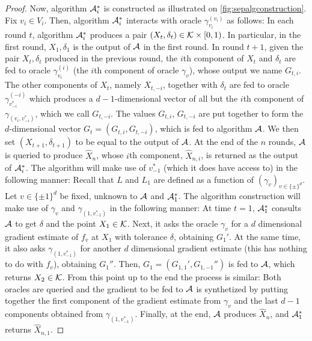 \begin{proof}
Now, algorithm $\mathcal{A}_i^*$ is constructed as illustrated on \cref{fig:sepalgconstruction}.
Fix $v_i\in V_i$. Then, algorithm $\mathcal{A}_i^*$ interacts with oracle $\gamma_{v_i}^{(v_i)}$ as follows:
In each round $t$, algorithm $\mathcal{A}_i^*$ produces a pair $(X_t,\delta_t) \in \mathcal{K} \times [0,1)$. 
In particular, in the first round, $X_1,\delta_1$ is the output of $\mathcal{A}$ in the first round.
In round $t+1$, given the pair $X_t,\delta_t$ produced in the previous round,
the $i$th component of $X_t$ and $\delta_t$ are fed to oracle $\gamma_{v_i}^{(i)}$ (the $i$th component of oracle $\gamma_v$), 
whose output we name $G_{t,i}$. 
The other components of $X_t$, namely $X_{t,-i}$, together with $\delta_t$ are fed to
oracle $\gamma_{v^*_{-i}}^{(-i)}$ which produces a $d-1$-dimensional vector of all but the $i$th component of $\gamma_{(v_i,v^*_{-i})}$, which we call $G_{t,-i}$. 
The values $G_{t,i}$, $G_{t,-i}$ are put together to form the $d$-dimensional vector 
$G_t = (G_{t,i},G_{t,-i})$, which is fed to algorithm $\mathcal{A}$.
We then set $(X_{t+1},\delta_{t+1})$ to be equal to the output of $\mathcal{A}$. 
At the end of the $n$ rounds, $\mathcal{A}$ is queried to produce $\hat{X}_n$, 
whose $i$th component, $\hat{X}_{n,i}$, 
is returned as the output of $\mathcal{A}_i^*$.
The algorithm will make use of $v_{-1}^*$ (which it does have access to) in the following manner:
Recall that $L$ and $L_1$ are defined as a function of $(\gamma_v)_{v\in \{\pm\}^d}$.
Let $v\in \{\pm 1\}^d$ be fixed, unknown to $\mathcal{A}$ and $\mathcal{A}_1^*$. 
The algorithm construction will make use of $\gamma_v$ and $\gamma_{(1,v_{-1}^*)}$ in the following manner:
At time $t=1$, $\mathcal{A}_1^*$ consults $\mathcal{A}$ to get $\delta$ and the point $X_1\in \mathcal{K}$.
Next, it asks the oracle $\gamma_v$ for a $d$ dimensional gradient estimate of $f_v$ at $X_1$ with tolerance $\delta$,
obtaining $G_1'$.
At the same time, it also asks $\gamma_{(1,v_{-1}^*)}$ for another $d$ dimensional gradient estimate (this has nothing to do with $f_v$), obtaining $G_1''$.
Then, $G_1 = (G_{1,1}',G_{1,-1}'')$ is fed to $\mathcal{A}$, which returns $X_2\in \mathcal{K}$. From this point up to the end the process is similar: Both oracles are queried and the gradient to be fed to $\mathcal{A}$ is synthetized by putting together the first component of the gradient estimate from $\gamma_v$ and the last $d-1$ components obtained from $\gamma_{(1,v_{-1}^*)}$.
Finally, at the end, $\mathcal{A}$ produces $\hat{X}_n$, and $\mathcal{A}_1^*$ returns $\hat{X}_{n,1}$.
\fi


\end{proof}
